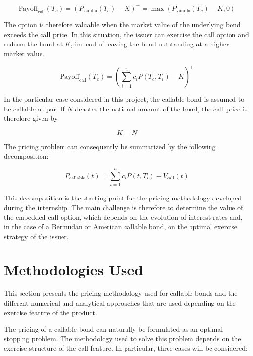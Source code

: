 \documentclass{article}
\begin{document}
\begin{equation}
\text{Payoff}_{\text{call}}(T_c)
=
\left(
P_{\text{vanilla}}(T_c) - K
\right)^+
=
\max\left(
P_{\text{vanilla}}(T_c) - K,
0
\right)
\end{equation}

The option is therefore valuable when the market value of the underlying bond exceeds the call price. In this situation, the issuer can exercise the call option and redeem the bond at $K$, instead of leaving the bond outstanding at a higher market value.


\begin{equation}
\text{Payoff}_{\text{call}}(T_c)
=
\left(
\sum_{i=1}^{n} c_i P(T_c,T_i) - K
\right)^+
\end{equation}

In the particular case considered in this project, the callable bond is assumed to be callable at par. If $N$ denotes the notional amount of the bond, the call price is therefore given by

\begin{equation}
K=N
\end{equation}

The pricing problem can consequently be summarized by the following decomposition:

\begin{equation}
P_{\text{callable}}(t)
=
\sum_{i=1}^{n} c_i P(t,T_i)
-
V_{\text{call}}(t)
\end{equation}

This decomposition is the starting point for the pricing methodology developed during the internship. The main challenge is therefore to determine the value of the embedded call option, which depends on the evolution of interest rates and, in the case of a Bermudan or American callable bond, on the optimal exercise strategy of the issuer.



\section{Methodologies Used}

This section presents the pricing methodology used for callable bonds and the different numerical and analytical approaches that are used depending on the exercise feature of the product.

The pricing of a callable bond can naturally be
formulated as an optimal stopping problem. The methodology used to
solve this problem depends on the exercise structure of the call
feature. In particular, three cases will be considered:
\end{document}
